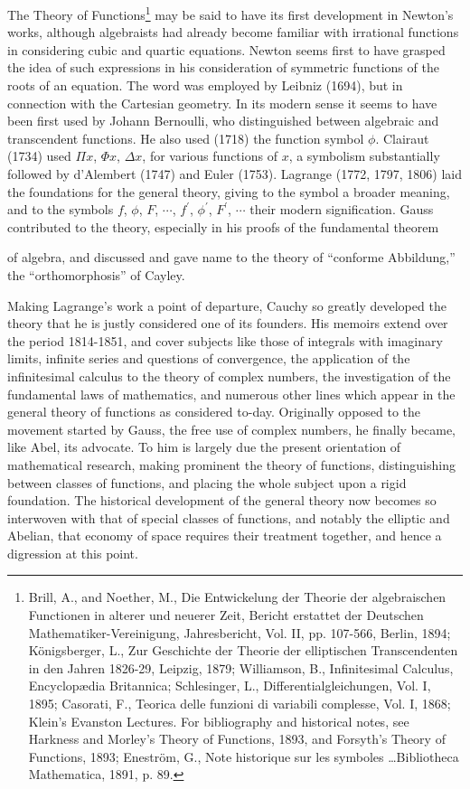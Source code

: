 \documentclass[oneside]{book}
\begin{document}
{The Theory of Functions\footnote{Brill, A., and Noether, M., Die
Entwickelung der Theorie der algebraischen Functionen in alterer
und neuerer Zeit, Bericht erstattet der Deutschen
Mathematiker-Vereinigung, Jahresbericht, Vol. II, pp. 107-566,
Berlin, 1894; K\"onigsberger, L., Zur Geschichte der Theorie der
elliptischen Transcendenten in den Jahren 1826-29, Leipzig, 1879;
Williamson, B., Infinitesimal Calculus, Encyclop\ae{}dia Britannica;
Schlesinger, L., Differentialgleichungen, Vol. I, 1895; Casorati,
F., Teorica delle funzioni di variabili complesse, Vol. I, 1868;
Klein's Evanston Lectures. For bibliography and historical notes,
see Harkness and Morley's Theory of Functions, 1893, and Forsyth's
Theory of Functions, 1893; Enestr\"om, G., Note historique sur les
symboles \ldots Bibliotheca Mathematica, 1891, p. 89.} may be said to
have its first development in Newton's works, although algebraists
had already become familiar with irrational functions in considering
cubic and quartic equations. Newton seems first to have grasped the
idea of such expressions in his consideration of symmetric functions
of the roots of an equation. The word was employed by Leibniz
(1694), but in connection with the Cartesian geometry. In its modern
sense it seems to have been first used by Johann Bernoulli, who
distinguished between algebraic and transcendent functions. He also
used (1718) the function symbol $\phi$. Clairaut (1734) used $\Pi
x$, $\Phi x$, $\Delta x$, for various functions of $x$, a symbolism
substantially followed by d'Alembert (1747) and Euler
(1753). Lagrange (1772, 1797, 1806) laid the foundations for the
general theory, giving to the symbol a broader meaning, and to the
symbols $f$, $\phi$, $F$, $\cdots$, $f^{\prime}$, $\phi^{\prime}$,
$F^{\prime}$, $\cdots$ their modern signification. Gauss contributed
to the theory, especially in his proofs of the fundamental theorem

of algebra, and discussed and gave name to the theory of ``conforme
Abbildung,'' the ``orthomorphosis'' of Cayley.

Making Lagrange's work a point of departure, Cauchy so greatly
developed the theory that he is justly considered one of its
founders. His memoirs extend over the period 1814-1851, and cover
subjects like those of integrals with imaginary limits, infinite
series and questions of convergence, the application of the
infinitesimal calculus to the theory of complex numbers, the
investigation of the fundamental laws of mathematics, and numerous
other lines which appear in the general theory of functions as
considered to-day. Originally opposed to the movement started by
Gauss, the free use of complex numbers, he finally became, like
Abel, its advocate. To him is largely due the present orientation of
mathematical research, making prominent the theory of functions,
distinguishing between classes of functions, and placing the whole
subject upon a rigid foundation. The historical development of the
general theory now becomes so interwoven with that of special
classes of functions, and notably the elliptic and Abelian, that
economy of space requires their treatment together, and hence a
digression at this point.

}
\end{document}

